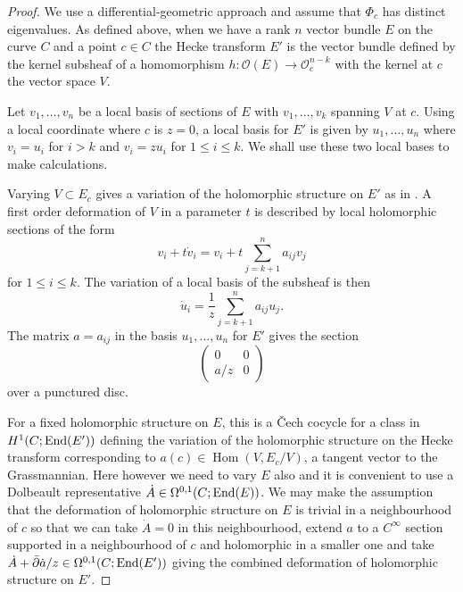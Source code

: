 \documentclass[12pt]{article}
\numberwithin{equation}{section}
\theoremstyle{remark}
\theoremstyle{definition}
\numberwithin{theorem}{section}
\DeclareMathOperator{\Hom}{Hom}
\newcommand{\End}{\textnormal{End}}
\renewcommand{\1}{\mathbbm{1}}
\begin{document}
\begin{proof}
	We use a differential-geometric approach and assume that $\Phi_c$ has distinct eigenvalues. 
	As defined above, when we have  a rank $n$ vector bundle $E$ on the curve $C$ and a point $c\in C$ the Hecke transform $E'$ is the vector bundle defined by the kernel subsheaf of a homomorphism $h: {\mathcal O}(E)\rightarrow {\mathcal O}_c^{n-k}$ with the kernel at $c$ the vector space $V$. 
	
	
	Let $v_1,\dots, v_n$ be a local basis of sections of $E$  with $v_1,\dots, v_k$ spanning $V$ at $c$. Using a local coordinate where $c$ is $z=0$,  a local basis for $E'$ is given by $ u_1,\dots,  u_n$ where $v_i=u_i$ for $i>k$  and $v_i=zu_i$ for $1\le i\le k$. 
	We shall use these two local bases to make calculations.
	
	Varying $V\subset E_c$ gives a variation of the holomorphic structure on $E'$ as in \cite{NR}. 
	A first order deformation of $V$  in a parameter $t$  is described by local holomorphic sections of the form 
	$$ v_i+t\dot v_i=v_i+t\sum_{j=k+1}^n a_{ij}v_j$$
	for $1\le i\le k$. The variation of a local basis of the  subsheaf is then 
	$$\dot u_i=\frac{1}{z} \sum_{j=k+1}^n a_{ij}u_j.$$
	The matrix $a=a_{ij}$ in the basis $u_1,\dots, u_n$ for $E'$ gives the    section
	$$\begin{pmatrix}  0 & 0 \\
	a/z& 0\end{pmatrix}$$ over a punctured disc. 
	
	For a fixed holomorphic structure on $E$, this is   a \v Cech
	cocycle for a class in $H^1(C;\End (E'))$ defining the variation of the holomorphic structure on the Hecke transform corresponding to $a(c)\in  \Hom(V,E_c/V)$, a tangent vector to the Grassmannian.    Here however we need to vary $E$ also and it is convenient to use 
	a Dolbeault representative $\dot A\in \Omega^{0,1}(C;\End (E))$. We may make the assumption that the deformation of holomorphic structure on $E$ is trivial in a neighbourhood of $c$ so that we can take $\dot A=0$ in this neighbourhood,  extend $a$ to a $C^{\infty}$ section  supported in a neighbourhood of $c$ and holomorphic in a smaller one and take $\dot A+\bar\partial \dot a/z\in \Omega^{0,1}(C; \End (E'))$ giving the combined deformation of holomorphic structure on $E'$. 
	

\end{proof}
\end{document}
